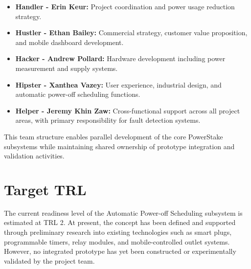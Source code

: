 \documentclass[11pt, twoside, a4paper]{article}
\begin{document}
\begin{itemize}
    \item \textbf{Handler - Erin Keur:} Project coordination and power usage reduction strategy.
    
    \item \textbf{Hustler - Ethan Bailey:} Commercial strategy, customer value proposition, and mobile dashboard development.
    
    \item \textbf{Hacker - Andrew Pollard:} Hardware development including power measurement and supply systems.
    
    \item \textbf{Hipster - Xanthea Vazey:} User experience, industrial design, and automatic power-off scheduling functions.
    
    \item \textbf{Helper - Jeremy Khin Zaw:} Cross-functional support across all project areas, with primary responsibility for fault detection systems.
\end{itemize}

This team structure enables parallel development of the core PowerStake subsystems while maintaining shared ownership of prototype integration and validation activities.



\section{Target TRL}

The current readiness level of the Automatic Power-off Scheduling subsystem is estimated at TRL 2. At present, the concept has been defined and supported through 
preliminary research into existing technologies such as smart plugs, programmable timers, relay modules, and mobile-controlled outlet systems. However, no integrated 
prototype has yet been constructed or experimentally validated by the project team.
\end{document}
